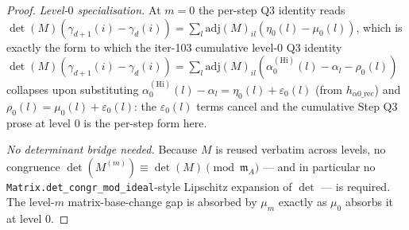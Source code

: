 \begin{proof}
\emph{Level-$0$ specialisation.} At $m = 0$ the per-step Q3
identity reads
$\det(M)(\gamma_{d+1}(i) - \gamma_d(i)) = \sum_l
\mathrm{adj}(M)_{il}(\eta_0(l) - \mu_0(l))$, which is exactly
the form to which the iter-103 cumulative level-$0$ Q3 identity
$\det(M)(\gamma_{d+1}(i) - \gamma_d(i)) = \sum_l
\mathrm{adj}(M)_{il}(\alpha^{(\mathrm{Hi})}_0(l) - \alpha_l -
\rho_0(l))$ collapses upon substituting
$\alpha^{(\mathrm{Hi})}_0(l) - \alpha_l = \eta_0(l) +
\varepsilon_0(l)$ (from $h_{\alpha 0\mathrm{\_rec}}$) and
$\rho_0(l) = \mu_0(l) + \varepsilon_0(l)$: the
$\varepsilon_0(l)$ terms cancel and the cumulative Step Q3
prose at level $0$ is the per-step form here.

\emph{No determinant bridge needed.} Because $M$ is reused
verbatim across levels, no congruence
$\det(M^{(m)}) \equiv \det(M) \pmod{\mathfrak m_A}$ — and in
particular no \texttt{Matrix.det\_congr\_mod\_ideal}-style
Lipschitz expansion of $\det$ — is required. The level-$m$
matrix-base-change gap is absorbed by $\mu_m$ exactly as $\mu_0$
absorbs it at level $0$.



\end{proof}
